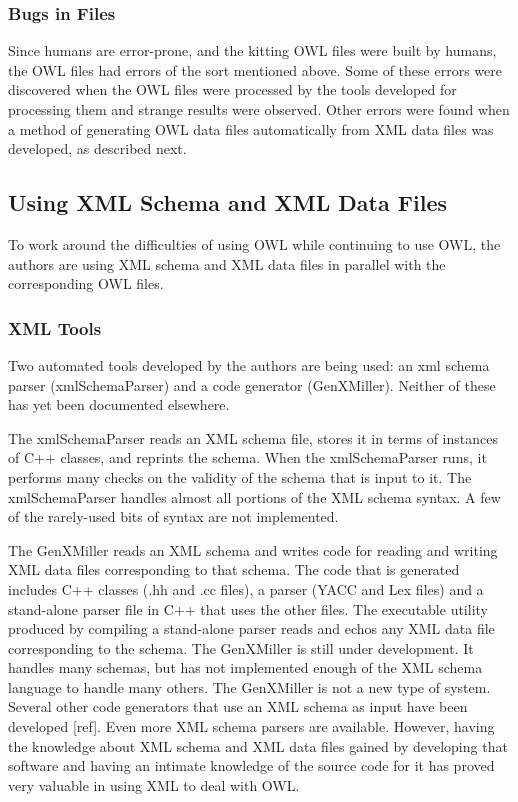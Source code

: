 \subsubsection{Bugs in Files}

Since humans are error-prone, and the kitting OWL files were built by
humans, the OWL files had errors of the sort mentioned above. Some of these
errors were discovered when the OWL files were processed by the tools
developed for processing them and strange results were observed. Other
errors were found when a method of generating OWL data files automatically
from XML data files was developed, as described next.

\subsection{Using XML Schema and XML Data Files}

To work around the difficulties of using OWL while continuing to use OWL,
the authors are using XML schema and XML data files in parallel with the
corresponding OWL files.\\

\subsubsection{XML Tools}

Two automated tools developed by the authors are being used: an xml schema
parser (xmlSchemaParser) and a code generator (GenXMiller).  Neither of
these has yet been documented elsewhere.

The xmlSchemaParser reads an XML schema file, stores it in terms of
instances of C++ classes, and reprints the schema. When the xmlSchemaParser
runs, it performs many checks on the validity of the schema that is input
to it. The xmlSchemaParser handles almost all portions of the XML schema
syntax. A few of the rarely-used bits of syntax are not implemented.

The GenXMiller reads an XML schema and writes code for reading and writing
XML data files corresponding to that schema. The code that is generated
includes C++ classes (.hh and .cc files), a parser (YACC and Lex files) and
a stand-alone parser file in C++ that uses the other files.  The executable
utility produced by compiling a stand-alone parser reads and echos any XML
data file corresponding to the schema. The GenXMiller is still under
development. It handles many schemas, but has not implemented enough of
the XML schema language to handle many others. The GenXMiller is not a
new type of system. Several other code generators that use an XML schema
as input have been developed [ref]. Even more XML schema parsers are
available. However, having the knowledge about XML schema and XML data
files gained by developing that software and having an intimate knowledge
of the source code for it has proved very valuable in using XML to deal
with OWL.

